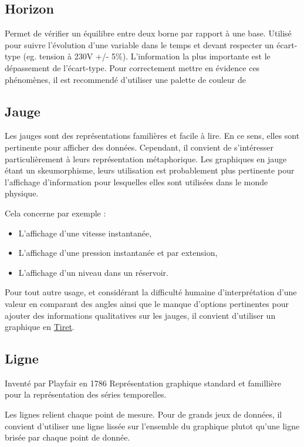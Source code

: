 \documentclass[a4paper,12pt]{article}
\begin{document}
\begin{multicols}{2}
\subsection*{Horizon}
\label{sec:org1678c4d}
Permet de vérifier un équilibre entre deux borne par rapport à une base. \autocite{alansmithLexiqueVisuel}  Utilisé pour suivre l'évolution d'une variable dans le temps et devant respecter un écart-type (eg. tension à 230V +/- 5\%). L'information la plus importante est le dépassement de l'écart-type. Pour correctement mettre en évidence ces phénomènes, il est recommendé d'utiliser une palette de couleur de
\subsection*{Jauge}
\label{sec:orgb2065b2}
Les jauges sont des représentations familières et facile à lire. \autocite{jonathanschwabishComparingCategories2021} En ce sens, elles sont pertinente pour afficher des données. Cependant, il convient de s'intéresser particulièrement à leurs représentation métaphorique. Les graphiques en jauge étant un skeumorphisme, leurs utilisation est probablement plus pertinente pour l'affichage d'information pour lesquelles elles sont utilisées dans le monde physique.

Cela concerne par exemple :
\begin{itemize}
\item L'affichage d'une vitesse instantanée,
\item L'affichage d'une pression instantanée et par extension,
\item L'affichage d'un niveau dans un réservoir.
\end{itemize}

Pour tout autre usage, et considérant la difficulté humaine d'interprétation d'une valeur en comparant des angles ainsi que le manque d'options pertinentes pour ajouter des informations qualitatives sur les jauges, il convient d'utiliser un graphique en \hyperref[sec:orgb189b05]{Tiret}.
\subsection*{Ligne}
\label{sec:orgcc7b114}
Inventé par Playfair en 1786 \autocite{sosulskiBecomingVisual2019}
Représentation graphique standard et famillière pour la représentation des séries temporelles. \autocite[,@Schwabish2021p86]{alansmithLexiqueVisuel}

Les lignes relient chaque point de mesure. Pour de grands jeux de données, il convient d'utiliser une ligne lissée sur l'ensemble du graphique plutot qu'une ligne brisée par chaque point de donnée. \autocite{wilkeDirectoryVisualizations2019}


\end{multicols}
\end{document}
